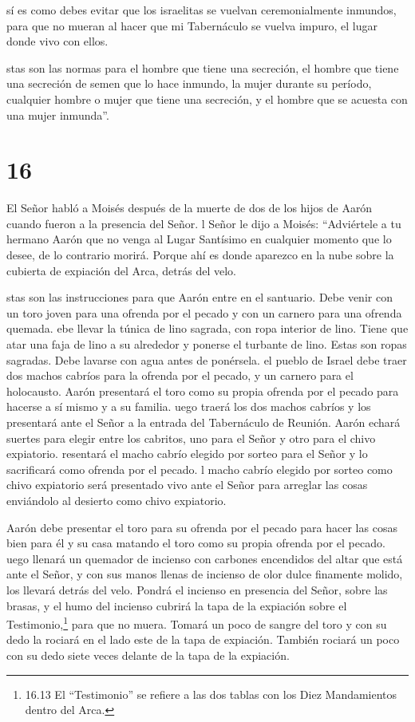 sí es como debes evitar que los israelitas se vuelvan
ceremonialmente inmundos, para que no mueran al hacer que mi Tabernáculo
se vuelva impuro, el lugar donde vivo con ellos.

 stas son las normas para el hombre que tiene una
secreción, el hombre que tiene una secreción de semen que lo hace
inmundo,  la mujer durante su período, cualquier hombre o
mujer que tiene una secreción, y el hombre que se acuesta con una mujer
inmunda''.

\hypertarget{section-15}{%
\section{16}\label{section-15}}

 El Señor habló a Moisés después de la muerte de dos de los
hijos de Aarón cuando fueron a la presencia del Señor.  l
Señor le dijo a Moisés: ``Adviértele a tu hermano Aarón que no venga al
Lugar Santísimo en cualquier momento que lo desee, de lo contrario
morirá. Porque ahí es donde aparezco en la nube sobre la cubierta de
expiación del Arca, detrás del velo.

 stas son las instrucciones para que Aarón entre en el
santuario. Debe venir con un toro joven para una ofrenda por el pecado y
con un carnero para una ofrenda quemada.  ebe llevar la
túnica de lino sagrada, con ropa interior de lino. Tiene que atar una
faja de lino a su alrededor y ponerse el turbante de lino. Estas son
ropas sagradas. Debe lavarse con agua antes de ponérsela. 
el pueblo de Israel debe traer dos machos cabríos para la ofrenda por el
pecado, y un carnero para el holocausto.  Aarón presentará
el toro como su propia ofrenda por el pecado para hacerse a sí mismo y a
su familia.  uego traerá los dos machos cabríos y los
presentará ante el Señor a la entrada del Tabernáculo de Reunión.
 Aarón echará suertes para elegir entre los cabritos, uno
para el Señor y otro para el chivo expiatorio.  resentará el
macho cabrío elegido por sorteo para el Señor y lo sacrificará como
ofrenda por el pecado.  l macho cabrío elegido por sorteo
como chivo expiatorio será presentado vivo ante el Señor para arreglar
las cosas enviándolo al desierto como chivo expiatorio.

 Aarón debe presentar el toro para su ofrenda por el pecado
para hacer las cosas bien para él y su casa matando el toro como su
propia ofrenda por el pecado.  uego llenará un quemador de
incienso con carbones encendidos del altar que está ante el Señor, y con
sus manos llenas de incienso de olor dulce finamente molido, los llevará
detrás del velo.  Pondrá el incienso en presencia del
Señor, sobre las brasas, y el humo del incienso cubrirá la tapa de la
expiación sobre el Testimonio,\footnote{16.13 El ``Testimonio'' se
  refiere a las dos tablas con los Diez Mandamientos dentro del Arca.}
para que no muera.  Tomará un poco de sangre del toro y con
su dedo la rociará en el lado este de la tapa de expiación. También
rociará un poco con su dedo siete veces delante de la tapa de la
expiación.

